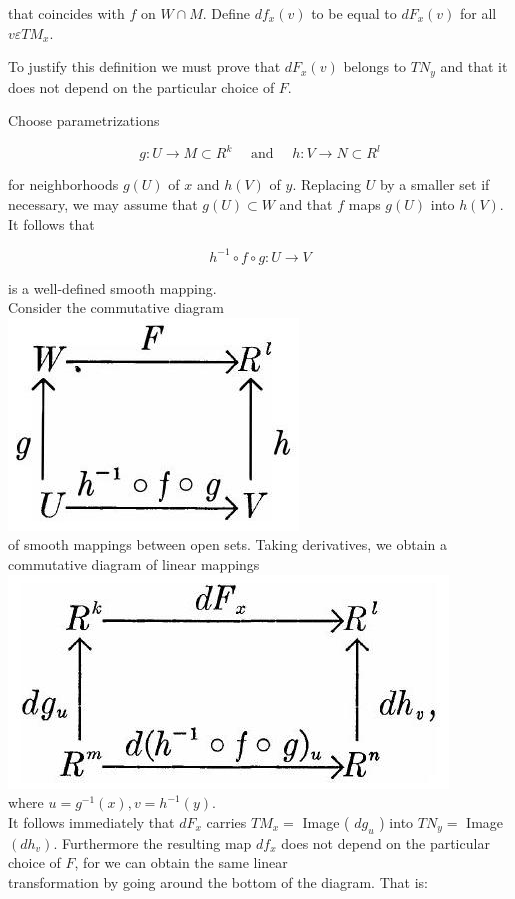 \documentclass[10pt, letterpaper]{article}
\begin{document}
that coincides with $f$ on $W \cap M$. Define $d f_{x}(v)$ to be equal to $d F_{x}(v)$ for all $v \varepsilon T M_{x}$.

To justify this definition we must prove that $d F_{x}(v)$ belongs to $T N_{y}$ and that it does not depend on the particular choice of $F$.

Choose parametrizations

$$
g: U \rightarrow M \subset R^{k} \quad \text { and } \quad h: V \rightarrow N \subset R^{l}
$$

for neighborhoods $g(U)$ of $x$ and $h(V)$ of $y$. Replacing $U$ by a smaller set if necessary, we may assume that $g(U) \subset W$ and that $f$ maps $g(U)$ into $h(V)$. It follows that

$$
h^{-1} \circ f \circ g: U \rightarrow V
$$

is a well-defined smooth mapping.\\
Consider the commutative diagram\\
\includegraphics[scale=0.2, center]{2025_05_28_7c9927389b272ddbc2c3g-17(1)}\\
of smooth mappings between open sets. Taking derivatives, we obtain a commutative diagram of linear mappings\\
\includegraphics[scale=0.2, center]{2025_05_28_7c9927389b272ddbc2c3g-17}\\
where $u=g^{-1}(x), v=h^{-1}(y)$.\\
It follows immediately that $d F_{x}$ carries $T M_{x}=$ Image ( $d g_{u}$ ) into $T N_{y}=$ Image $\left(d h_{v}\right)$. Furthermore the resulting map $d f_{x}$ does not depend on the particular choice of $F$, for we can obtain the same linear\\
transformation by going around the bottom of the diagram. That is:
\end{document}
